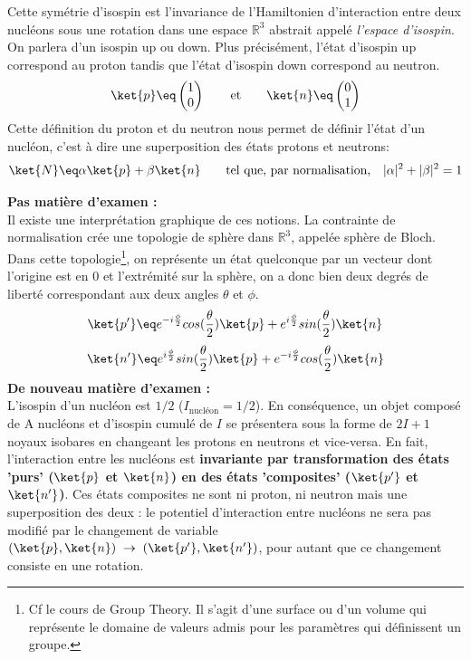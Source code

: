 Cette symétrie d'isospin est l'invariance de l'Hamiltonien d'interaction entre deux nucléons sous une rotation dans une espace $\mathbb{R}^3$ abstrait appelé \textit{l'espace d'isospin}. On parlera d'un isospin up ou down. Plus précisément, l'état d'isospin up correspond au proton tandis que l'état d'isospin down correspond au neutron.
\begin{equation*}
    \ket{p} \eq 
    \begin{pmatrix}
    1 \\ 0
    \end{pmatrix}
    \qquad \text{et}\qquad
    \ket{n} \eq 
    \begin{pmatrix}
    0 \\ 1
    \end{pmatrix}
\end{equation*}
Cette définition du proton et du neutron nous permet de définir l'état d'un nucléon, c'est à dire une superposition des états protons et neutrons:
\begin{equation*}
    \ket{N} \eq \alpha \ket{p} + \beta\ket{n}
    \qquad \text{tel que, par normalisation,} \quad
    |\alpha|^2+|\beta|^2=1
\end{equation*}

\textbf{Pas matière d'examen :}\\
Il existe une interprétation graphique de ces notions. La contrainte de normalisation crée une topologie de sphère dans $\mathbb{R}^3$, appelée sphère de Bloch. Dans cette topologie\footnote{Cf le cours de Group Theory. Il s'agit d'une surface ou d'un volume qui représente le domaine de valeurs admis pour les paramètres qui définissent un groupe.}, on représente un état quelconque par un vecteur dont l'origine est en 0 et l'extrémité sur la sphère, on a donc bien deux degrés de liberté correspondant aux deux angles $\theta$ et $\phi$.\\
\begin{equation*}
    \ket{p'} \eq e^{-i\frac{\phi}{2}}cos(\frac{\theta}{2})\ket{p} + e^{i\frac{\phi}{2}}sin(\frac{\theta}{2})\ket{n}
\end{equation*}
\begin{equation*}
    \ket{n'} \eq e^{i\frac{\phi}{2}}sin(\frac{\theta}{2})\ket{p} + e^{-i\frac{\phi}{2}}cos(\frac{\theta}{2})\ket{n}
\end{equation*}
\textbf{De nouveau matière d'examen :}\\
L'isospin d'un nucléon est $1/2$ ($I_{\text{nucléon}} =1/2$). En conséquence, un objet composé de A nucléons et d'isospin cumulé de $I$ se présentera sous la forme de $2I+1$ noyaux isobares en changeant les protons en neutrons et vice-versa. En fait, l'interaction entre les nucléons est \textbf{invariante par transformation des états 'purs' ($\ket{p}$ et $\ket{n}$) en des états 'composites' ($\ket{p'}$ et $\ket{n'}$)}. Ces états composites ne sont ni proton, ni neutron mais une superposition des deux : le potentiel d'interaction entre nucléons ne sera pas modifié par le changement de variable $(\ket{p},\ket{n}) \;\rightarrow\; (\ket{p'},\ket{n'})$, pour autant que ce changement consiste en une rotation.\\

